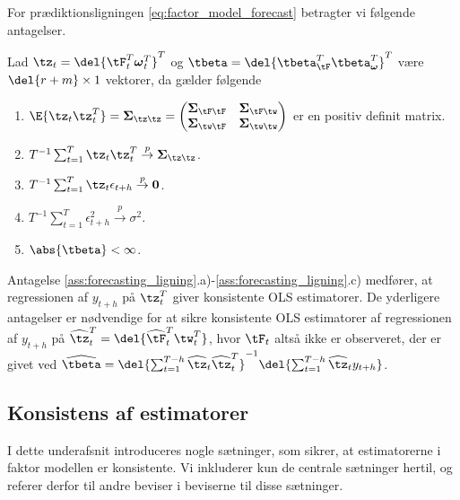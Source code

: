 %
For prædiktionsligningen \eqref{eq:factor_model_forecast} betragter vi følgende antagelser.
%
\begin{ass}[Prædiktionsligning] \label{ass:forecasting_ligning}
Lad \(\tz_t = \del{\tF_t^T \boldsymbol{\omega}_t^T}^T\) og \(\tbeta = \del{\tbeta_{\tF}^T \tbeta_{\boldsymbol{\omega}}^T}^T\) være \(\del{r+m} \times 1\) vektorer, da gælder følgende
\begin{enumerate}[label=\alph*)]
\item \(\E{\tz_t \tz_t^T} = \boldsymbol{\Sigma}_{\tz \tz} = \begin{pmatrix}
\boldsymbol{\Sigma}_{\tF \tF} & \boldsymbol{\Sigma}_{\tF \tw} \\
\boldsymbol{\Sigma}_{\tw \tF} & \boldsymbol{\Sigma}_{\tw \tw}
\end{pmatrix} \) er en positiv definit matrix.
\item \(T^{-1} \sum_{t=1}^T \tz_t \tz_t^T \overset{p}{\rightarrow} \boldsymbol{\Sigma}_{\tz \tz}\).
\item \(T^{-1} \sum_{t=1}^T \tz_t \epsilon_{t+h} \overset{p}{\rightarrow} \mathbf{0}\).
\item  \(T^{-1} \sum_{t=1}^T \epsilon_{t+h}^2 \overset{p}{\rightarrow} \sigma^2\).
\item \(\abs{\tbeta} < \infty\).
\end{enumerate}
\end{ass}
%
Antagelse \ref{ass:forecasting_ligning}.a)-\ref{ass:forecasting_ligning}.c) medfører, at regressionen af \(y_{t+h}\) på \(\tz_t^T\) giver konsistente OLS estimatorer.
De yderligere antagelser er nødvendige for at sikre konsistente OLS estimatorer af regressionen af \(y_{t+h}\) på \(\widehat{\tz}_t^T =\del{\widehat{\tF}_t^T \tw_t^T}\), hvor \(\tF_t\) altså ikke er observeret, der er givet ved \(\widehat{\tbeta} = \del{\sum_{t=1}^{T-h} \widehat{\tz}_t \widehat{\tz}_t^T}^{-1} \del{\sum_{t=1}^{T-h} \widehat{\tz}_t y_{t+h}}\).

\subsection{Konsistens af estimatorer}
I dette underafsnit introduceres nogle sætninger, som sikrer, at estimatorerne i faktor modellen er konsistente.
Vi inkluderer kun de centrale sætninger hertil, og referer derfor til andre beviser i beviserne til disse sætninger.

